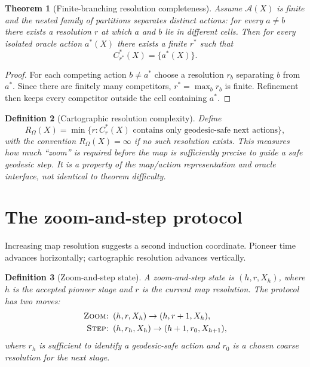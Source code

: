 \documentclass[11pt]{article}
\newtheorem{definition}{Definition}[section]
\newtheorem{theorem}[definition]{Theorem}
\theoremstyle{remark}
\newcommand{\Omni}{\Omega}
\begin{document}
\begin{theorem}[Finite-branching resolution completeness]
Assume $\mathcal A(X)$ is finite and the nested family of partitions separates distinct actions: for every $a\ne b$ there exists a resolution $r$ at which $a$ and $b$ lie in different cells. Then for every isolated oracle action $a^*(X)$ there exists a finite $r^*$ such that
\[
C_{r^*}^*(X)=\{a^*(X)\}.
\]
\end{theorem}
\begin{proof}
For each competing action $b\ne a^*$ choose a resolution $r_b$ separating $b$ from $a^*$. Since there are finitely many competitors, $r^*=\max_b r_b$ is finite. Refinement then keeps every competitor outside the cell containing $a^*$.
\end{proof}

\begin{definition}[Cartographic resolution complexity]
Define
\[
R_{\Omni}(X)=\min\{r: C_r^*(X)\text{ contains only geodesic-safe next actions}\},
\]
with the convention $R_{\Omni}(X)=\infty$ if no such resolution exists. This measures how much ``zoom'' is required before the map is sufficiently precise to guide a safe geodesic step. It is a property of the map/action representation and oracle interface, not identical to theorem difficulty.
\end{definition}

\section{The zoom-and-step protocol}

Increasing map resolution suggests a second induction coordinate. Pioneer time advances horizontally; cartographic resolution advances vertically.

\begin{definition}[Zoom-and-step state]
A zoom-and-step state is $(h,r,X_h)$, where $h$ is the accepted pioneer stage and $r$ is the current map resolution. The protocol has two moves:
\begin{align*}
\textsc{Zoom: }&(h,r,X_h)\to(h,r+1,X_h),\\
\textsc{Step: }&(h,r_h,X_h)\to(h+1,r_0,X_{h+1}),
\end{align*}
where $r_h$ is sufficient to identify a geodesic-safe action and $r_0$ is a chosen coarse resolution for the next stage.
\end{definition}
\end{document}
